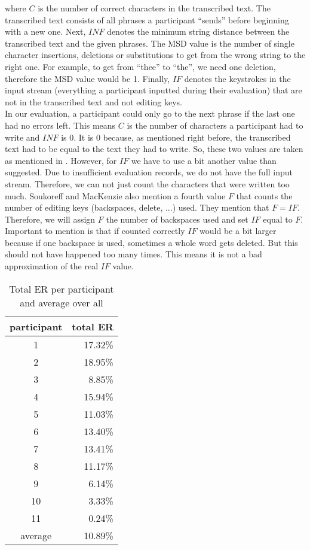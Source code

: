where $C$ is the number of correct characters in the transcribed text. The transcribed text consists of all phrases a participant ``sends'' before beginning with a new one. Next, $INF$ denotes the minimum string distance between the transcribed text and the given phrases. The MSD value is the number of single character insertions, deletions or substitutions to get from the wrong string to the right one. For example, to get from ``thee'' to ``the'', we need one deletion, therefore the MSD value would be 1. Finally, $IF$ denotes the keystrokes in the input stream (everything a participant inputted during their evaluation) that are not in the transcribed text and not editing keys.\\
In our evaluation, a participant could only go to the next phrase if the last one had no errors left. This means $C$ is the number of characters a participant had to write and $INF$ is 0. It is 0 because, as mentioned right before, the transcribed text had to be equal to the text they had to write. So, these two values are taken as mentioned in \cite{10.1145/642611.642632}. However, for $IF$ we have to use a bit another value than suggested. Due to insufficient evaluation records, we do not have the full input stream. Therefore, we can not just count the characters that were written too much. Soukoreff and MacKenzie also mention a fourth value $F$ that counts the number of editing keys (backspaces, delete, ...) used. They mention that $F = IF$. Therefore, we will assign $F$ the number of backspaces used and set $IF$ equal to $F$. Important to mention is that if counted correctly $IF$ would be a bit larger because if one backspace is used, sometimes a whole word gets deleted. But this should not have happened too many times. This means it is not a bad approximation of the real $IF$ value.
\begin{table}[H]
    \centering
    \caption{Total ER per participant and average over all}
    \begin{tabular}{cr} \toprule
        participant&total ER\\ \midrule
        1&17.32\%\\
        2&18.95\%\\
        3&8.85\%\\
        4&15.94\%\\
        5&11.03\%\\
        6&13.40\%\\
        7&13.41\%\\
        8&11.17\%\\
        9&6.14\%\\
        10&3.33\%\\
        11&0.24\%\\\midrule
        average&10.89\%\\
        \bottomrule
    \end{tabular}
    \label{tab:total_er}
\end{table}
